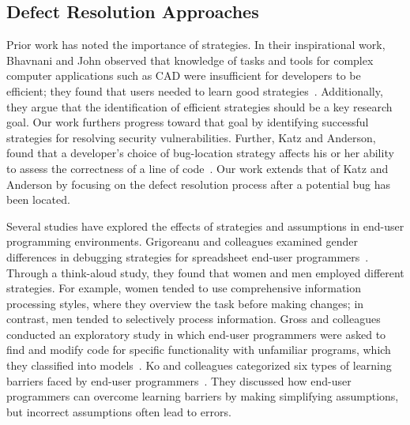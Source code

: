 \documentclass[10pt,journal,compsoc]{IEEEtran}
\begin{document}
\subsection{Defect Resolution Approaches}
\label{strategies}
Prior work has noted the importance of strategies.
In their inspirational work, Bhavnani and John observed that knowledge of tasks and tools for complex computer applications such as CAD were insufficient for developers to be efficient; they found that users needed to learn good strategies~\cite{Bhavnani2000}. 
Additionally, they argue that the identification of efficient strategies should be a key research goal. 
Our work furthers progress toward that goal by identifying successful strategies for resolving security vulnerabilities.
Further, Katz and Anderson, found that a developer's choice of bug-location strategy affects his or her ability to assess the correctness of a line of code~\cite{Katz:1987}.
Our work extends that of Katz and Anderson by focusing on the defect resolution process after a potential bug has been located.


Several studies have explored the effects of strategies and assumptions in end-user programming environments.
Grigoreanu and colleagues examined gender differences in debugging strategies for spreadsheet end-user programmers~\cite{Grigoreanu:2012:sense, Grigoreanu:2009}. 
Through a think-aloud study, they found that women and men employed different strategies. 
For example, women tended to use comprehensive information processing styles, where they overview the task before making changes; in contrast, men tended to selectively process information.
Gross and colleagues conducted an exploratory study in which end-user programmers were asked to find and modify code for specific functionality with unfamiliar programs, which they classified into models~\cite{Gross:2010}.
Ko and colleagues categorized six types of learning barriers faced by end-user programmers~\cite{Ko:2004:barriers}.
They discussed how end-user programmers can overcome learning barriers by making simplifying assumptions, but incorrect assumptions often lead to errors.


\end{document}
